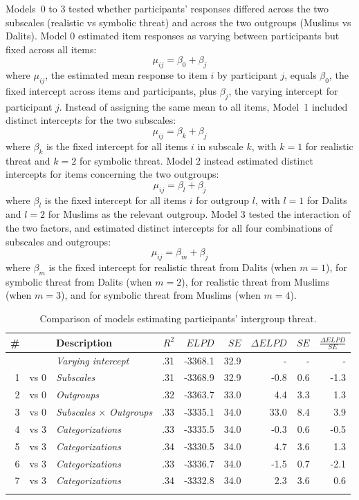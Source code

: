 \documentclass[12pt, a4paper]{article}
\begin{document}
Models~0 to 3 tested whether participants' responses differed across the two subscales (realistic vs symbolic threat) and across the two outgroups (Muslims vs Dalits).  Model 0 estimated item responses as varying between participants but fixed across all items: $$ \mu_{ij} = \beta_0 + \beta_{j} $$ where $\mu_{ij}$, the estimated mean response to item $i$ by participant $j$, equals $\beta_0$, the fixed intercept across items and participants, plus $\beta_j$, the varying intercept for participant $j$. Instead of assigning the same mean to all items, Model~1 included distinct intercepts for the two subscales: $$ \mu_{ij} = \beta_k + \beta_{j} $$ where $\beta_k$ is the fixed intercept for all items $i$ in subscale $k$, with $k = 1$ for realistic threat and $k = 2$ for symbolic threat. Model 2 instead estimated distinct intercepts for items concerning the two outgroups: $$ \mu_{ij} = \beta_l + \beta_{j} $$ where $\beta_l$ is the fixed intercept for all items $i$ for outgroup $l$, with $l = 1$ for Dalits and $l = 2$ for Muslims as the relevant outgroup. Model 3 tested the interaction of the two factors, and estimated distinct intercepts for all four combinations of subscales and outgroups: $$ \mu_{ij} = \beta_m + \beta_{j} $$ where $\beta_m$ is the fixed intercept for realistic threat from Dalits (when $m = 1$), for symbolic threat from Dalits (when $m = 2$), for realistic threat from Muslims (when $m = 3$), and for symbolic threat from Muslims (when $m = 4$). 

\begin{table}
\centering
{}
\caption[Model comparison for intergroup threat]{Comparison of models estimating participants' intergroup threat.}
\small	
\begin{tabularx}{\linewidth}{r@{~}rXrrrrrr} \toprule
\# &  &  Description &  $R^2$ & $\textit{ELPD}$ & $\textit{SE}$ & $\Delta\textit{ELPD}$ & $\textit{SE}$ & $\frac{\Delta\textit{ELPD}}{\textit{SE}}$ \\ \midrule \addlinespace
0 &      & \textit{Varying intercept} & .31 & -3368.1 & 32.9 & - & - & - \\
1 & vs 0 & \textit{Subscales}         & .31 & -3368.9 & 32.9 & -0.8 & 0.6 & -1.3 \\
2 & vs 0 & \textit{Outgroups} & .32 & -3363.7 & 33.0 & 4.4 & 3.3 & 1.3 \\
3 & vs 0 & \textit{Subscales $\times$ Outgroups} & .33 & -3335.1 & 34.0 & 33.0 & 8.4 & 3.9  \\ \midrule
4 & vs 3 & \textit{Categorizations}   & .33 & -3335.5 & 34.0 & -0.3 & 0.6 & -0.5  \\
5 & vs 3 & \textit{Categorizations}   & .34 & -3330.5 & 34.0 & 4.7 & 3.6 & 1.3 \\
6 & vs 3 & \textit{Categorizations}   & .33 & -3336.7 & 34.0 & -1.5 & 0.7 & -2.1 \\
7 & vs 3 & \textit{Categorizations}   & .34 & -3332.8 & 34.0 & 2.3 & 3.6 & 0.6 \\ \addlinespace \bottomrule
\end{tabularx}
\label{tab:d-1}
\end{table}
\end{document}
